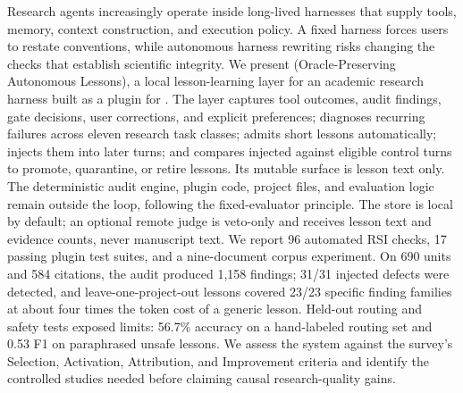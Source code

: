 Research agents increasingly operate inside long-lived harnesses that supply tools, memory, context construction, and execution policy. A fixed harness forces users to restate conventions, while autonomous harness rewriting risks changing the checks that establish scientific integrity. We present \system{} (Oracle-Preserving Autonomous Lessons), a local lesson-learning layer for an academic research harness built as a plugin for \dsh{}. The layer captures tool outcomes, audit findings, gate decisions, user corrections, and explicit preferences; diagnoses recurring failures across eleven research task classes; admits short lessons automatically; injects them into later turns; and compares injected against eligible control turns to promote, quarantine, or retire lessons. Its mutable surface is lesson text only. The deterministic audit engine, plugin code, project files, and evaluation logic remain outside the loop, following the fixed-evaluator principle. The store is local by default; an optional remote judge is veto-only and receives lesson text and evidence counts, never manuscript text. We report 96 automated RSI checks, 17 passing plugin test suites, and a nine-document corpus experiment. On 690 units and 584 citations, the audit produced 1,158 findings; 31/31 injected defects were detected, and leave-one-project-out lessons covered 23/23 specific finding families at about four times the token cost of a generic lesson. Held-out routing and safety tests exposed limits: 56.7\% accuracy on a hand-labeled routing set and 0.53 F1 on paraphrased unsafe lessons. We assess the system against the survey's Selection, Activation, Attribution, and Improvement criteria and identify the controlled studies needed before claiming causal research-quality gains.
